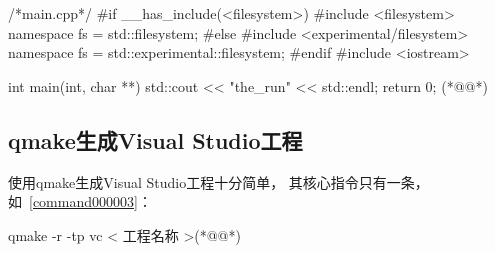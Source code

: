 \addtocounter{lstlisting}{-1}   %

\label{f00000a}    %
\FloatBarrier                                  %
\begin{thebookfilesourceone}[escapeinside={(*@}{@*)},
caption=GoodLuck,
title=\filesourcenumbernameone \thefilesourcenumber
]
/*main.cpp*/
#if __has_include(<filesystem>)
#include <filesystem>
namespace fs = std::filesystem;
#else
#include <experimental/filesystem>
namespace fs = std::experimental::filesystem;
#endif
#include <iostream>

int main(int, char **) {
    std::cout << "the_run" << std::endl;
    return 0;
}(*@\marginpar[\hfill\setlength\fboxsep{2pt}\fbox{\footnotesize{\kaishu\parbox{1em}{\setlength{\baselineskip}{2pt}\filesourcenumbernameone}}\footnotesize{\thefilesourcenumber}}]{\setlength\fboxsep{2pt}\fbox{\footnotesize{\kaishu\parbox{1em}{\setlength{\baselineskip}{2pt}\filesourcenumbernameone}}\footnotesize{\thefilesourcenumber}}}@*)\end{thebookfilesourceone}          %
\addtocounter{lstlisting}{-1}   %


\FloatBarrier
\subsection{
qmake生成Visual Studio工程
}\label{ss000910}

使用qmake生成Visual Studio工程十分简单，
其核心指令只有一条，
如\commandnumbernameone\ \ref{command000003}：

{}\label{command000003}    %
\begin{thebookfilesourceonecommand}[escapeinside={(*@}{@*)},
caption=GoodLuck,
title=\commandnumbernameone \thecommandnumber
]
qmake -r -tp vc < 工程名称 >(*@\marginpar[\hfill\setlength\fboxsep{2pt}\fbox{\footnotesize{\kaishu\parbox{1em}{\setlength{\baselineskip}{2pt}\commandnumbernameone}}\footnotesize{\thecommandnumber}}]{\setlength\fboxsep{2pt}\fbox{\footnotesize{\kaishu\parbox{1em}{\setlength{\baselineskip}{2pt}\commandnumbernameone}}\footnotesize{\thecommandnumber}}}@*)\end{thebookfilesourceonecommand}          %
\addtocounter{lstlisting}{-1}   %



